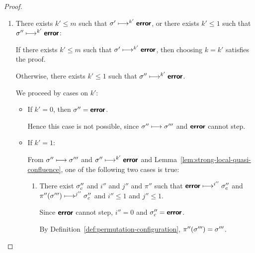 \begin{proof}
\begin{enumerate}
\begin{itemize}
\begin{enumerate}
        By Definition~\ref{def:permutation-configuration},
        $\pi'(\error) = \error$, and so $\conf'_c \ctxstepsto
        \error$.

        Therefore $\conf' \ctxstepsto^{i'} \conf'_c \ctxstepsto
        \error$.

        Hence $\conf' \ctxstepsto^{i'+1} \error$.

        Since $i' \leq m$, we have that $i' + 1 \leq m + 1$, and
        so choosing $k = i' + 1$ satisfies the proof.
        
      \end{enumerate}

    \end{itemize}

  \item There exists $k' \leq m$ such that $\sigma' \longmapsto^{k'}
    \textbf{\textsf{error}}$, or there exists $k' \leq 1$ such that $\sigma''
    \longmapsto^{k'} \textbf{\textsf{error}}$:

    If there exists $k' \leq m$ such that $\sigma' \longmapsto^{k'}
    \textbf{\textsf{error}}$, then choosing $k = k'$ satisfies the proof.

    Otherwise, there exists $k' \leq 1$ such that $\sigma''
    \longmapsto^{k'} \textbf{\textsf{error}}$.

    We proceed by cases on $k'$:

    \begin{itemize}

    \item If $k' = 0$, then $\sigma'' = \textbf{\textsf{error}}$.

      Hence this case is not possible, since $\sigma'' \longmapsto
      \sigma'''$ and $\textbf{\textsf{error}}$ cannot step.

    \item If $k' = 1$:

      From $\sigma'' \longmapsto \sigma'''$ and $\sigma''
      \longmapsto^{k'} \textbf{\textsf{error}}$ and
      Lemma~\ref{lem:strong-local-quasi-confluence}, one of the
      following two cases is true:

      \begin{enumerate}
      \item There exist $\sigma_c''$ and $i''$ and $j''$ and $\pi''$
        such that $\textbf{\textsf{error}} \longmapsto^{i''} \sigma_c''$ and
        $\pi''(\sigma''') \longmapsto^{j''} \sigma_c''$ and $i'' \leq
        1$ and $j'' \leq 1$.

        Since $\textbf{\textsf{error}}$ cannot step, $i'' = 0$ and $\sigma''_c =
        \textbf{\textsf{error}}$.

        By Definition~\ref{def:permutation-configuration},
        $\pi''(\sigma''') = \sigma'''$.


\end{enumerate}
\end{itemize}
\end{enumerate}
\end{proof}
